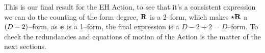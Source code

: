 This is our final result for the EH Action, to see that it's a consistent expression we can do the counting of the form degree, $\vb R$ is a 2--form, which makes $\star\vb R$ a $\qty(D-2)$--form, as $\vb e$ is a 
1--form, the final expression is a $D-2+2=D$--form. To check the redundancies and equations of motion of the Action is the matter of the next sections.